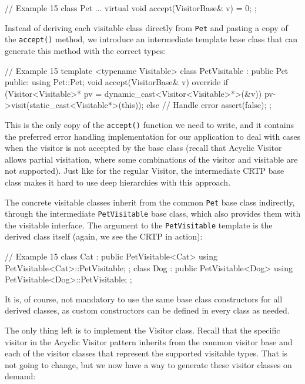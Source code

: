 \begin{code}
// Example 15
class Pet {
  ...
  virtual void accept(VisitorBase& v) = 0;
};
\end{code}

Instead of deriving each visitable class directly from \texttt{Pet} and pasting a copy of the \texttt{accept()} method, we introduce an intermediate template base class that can generate this method with the correct types:

\begin{code}
// Example 15
template <typename Visitable>
class PetVisitable : public Pet {
  public:
  using Pet::Pet;
  void accept(VisitorBase& v) override {
    if (Visitor<Visitable>* pv =
        dynamic_cast<Visitor<Visitable>*>(&v)) {
      pv->visit(static_cast<Visitable*>(this));
    } else { // Handle error
      assert(false);
    }
 }
};
\end{code}

This is the only copy of the \texttt{accept()} function we need to write, and it contains the preferred error handling implementation for our application to deal with cases when the visitor is not accepted by the base class (recall that Acyclic Visitor allows partial visitation, where some combinations of the visitor and visitable are not supported). Just like for the regular Visitor, the intermediate CRTP base class makes it hard to use deep hierarchies with this approach.

The concrete visitable classes inherit from the common \texttt{Pet} base class indirectly, through the intermediate \texttt{PetVisitable} base class, which also provides them with the visitable interface. The argument to the \texttt{PetVisitable} template is the derived class itself (again, we see the CRTP in action):

\begin{code}
// Example 15
class Cat : public PetVisitable<Cat> {
  using PetVisitable<Cat>::PetVisitable;
};
class Dog : public PetVisitable<Dog> {
  using PetVisitable<Dog>::PetVisitable;
};
\end{code}

It is, of course, not mandatory to use the same base class constructors for all derived classes, as custom constructors can be defined in every class as needed.

The only thing left is to implement the Visitor class. Recall that the specific visitor in the Acyclic Visitor pattern inherits from the common visitor base and each of the visitor classes that represent the supported visitable types. That is not going to change, but we now have a way to generate these visitor classes on demand:

